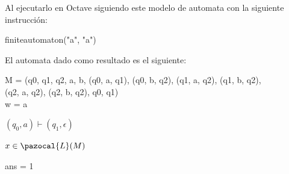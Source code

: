 \documentclass[fleqn, 10pt]{article}
\newcommand{\Lb}{\pazocal{L}}
\theoremstyle{plain}
\theoremstyle{definition}
\begin{document}
\begin{flushleft}
Al ejecutarlo en Octave siguiendo este modelo de automata con la siguiente instrucción:
	\begin{center}
	finiteautomaton("a", "a")
	\end{center}
El automata dado como resultado es el siguiente:

M = ({q0, q1, q2}, {a, b}, {(q0, a, q1), (q0, b, q2), (q1, a, q2), (q1, b, q2), 
\\(q2, a, q2), (q2, b, q2)}, q0, {q1})
\\w = a

$(q_0,a)\vdash(q_1,\epsilon)$

$x \in\Lb(M) $

ans = 1
\end{flushleft}
\end{document}
